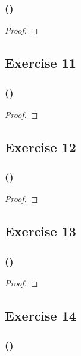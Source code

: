 \documentclass[14pt]{extarticle}
\begin{document}
\subsubsection{()}

\begin{proof}

\end{proof}

\subsection{Exercise 11}

\subsubsection{()}

\begin{proof}

\end{proof}

\subsection{Exercise 12}

\subsubsection{()}

\begin{proof}

\end{proof}

\subsection{Exercise 13}

\subsubsection{()}

\begin{proof}

\end{proof}

\subsection{Exercise 14}

\subsubsection{()}
\end{document}
